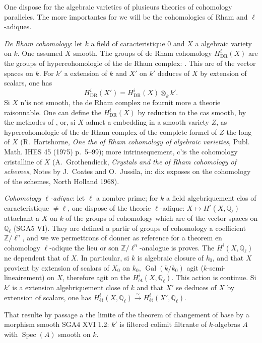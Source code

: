 \documentclass[12pt,a4paper]{article}
\theoremstyle{plain}
\theoremstyle{definition}
\theoremstyle{remark}
\DeclareMathOperator{\Spec}{Spec}
\DeclareMathOperator{\Gal}{Gal}
\providecommand{\Gal}{\operatorname{Gal}}
\providecommand{\Spec}{\operatorname{Spec}}
\providecommand{\DR}{\mathrm{DR}}
\begin{document}
One dispose for the algebraic varieties of plusieurs theories of cohomology
paralleles. The more importantes for we will be the cohomologies of Rham and
$\ell$-adiques.

\emph{De Rham cohomology}: let $k$ a field of caracteristique $0$ and $X$ a
algebraic variety on $k$. One assumed $X$ smooth. The groups of de Rham cohomology $H^i_{\DR}(X)$ are the groups of hypercohomologie of the de Rham complex:
\cite{G}. This are of the vector spaces on $k$. For $k'$ a extension of $k$ and $X'$
on $k'$ deduces of $X$ by extension of scalars, one has
\[
H^i_{\DR}(X') = H^i_{\DR}(X) \otimes_k k'.
\]
Si $X$ n'is not smooth, the de Rham complex ne fournit more a theorie raisonnable.
One can define the $H^i_{\DR}(X)$ by reduction to the cas smooth, by the methodes of
\cite{D3}, or, si $X$ admet a embedding in a smooth variety $Z$, as
hypercohomologie of the de Rham complex of the complete formel of $Z$ the long of $X$
(R.~Hartshorne, \textit{One the of Rham cohomology of algebraic varieties}, Publ. Math.
IHES 45 (1975) p.~5--99); more intrinsequement, c'is the cohomology cristalline of $X$
(A.~Grothendieck, \textit{Crystals and the of Rham cohomology of schemes}, Notes by
J.~Coates and O.~Jussila, in: dix exposes on the cohomology of the schemes, North
Holland 1968).

\emph{Cohomology $\ell$-adique}: let $\ell$ a nombre prime; for $k$ a field
algebriquement clos of caracteristique $\neq \ell$, one dispose of the theorie
$\ell$-adique: $X \mapsto H^i(X, \mathbb{Q}_\ell)$ attachant a $X$ on $k$ of the groups of
cohomology which are of the vector spaces on $\mathbb{Q}_\ell$ (SGA5 VI). They are
defined a partir of groups of cohomology a coefficient $\mathbb{Z}/\ell^n$, and we we
permettrons of donner as reference for a theorem en cohomology
$\ell$-adique the lieu or son $\mathbb{Z}/\ell^n$-analogue is proves. The $H^i(X,\mathbb{Q}_\ell)$
ne dependent that of $X$. In particular, si $k$ is algebraic closure of $k_0$, and
that $X$ provient by extension of scalars of $X_0$ on $k_0$, $\Gal(k/k_0)$ agit
($k$-semi-lineairement) on $X$, therefore agit on the $H^i_\text{\'et}(X, \mathbb{Q}_\ell)$.
This action is continue. Si $k'$ is a extension algebriquement close of $k$ and that
$X'$ se deduces of $X$ by extension of scalars, one has
$H^i_\text{\'et}(X, \mathbb{Q}_\ell) \xrightarrow{\sim} H^i_\text{\'et}(X', \mathbb{Q}_\ell)$.

That resulte by passage a the limite of the theorem of changement of base by a
morphism smooth SGA4 XVI 1.2: $k'$ is filtered colimit filtrante of $k$-algebras $A$
with $\Spec(A)$ smooth on $k$.
\end{document}
